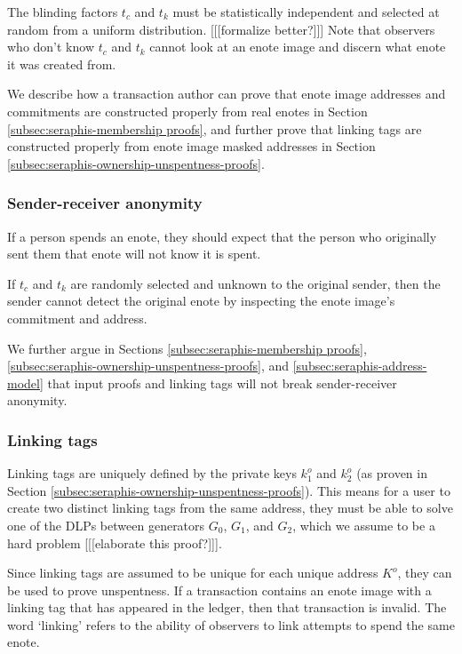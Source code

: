 The blinding factors $t_c$ and $t_k$ must be statistically independent and selected at random from a uniform distribution. [[[formalize better?]]] Note that observers who don't know $t_c$ and $t_k$ cannot look at an enote image and discern what enote it was created from.

We describe how a transaction author can prove that enote image addresses and commitments are constructed properly from real enotes in Section \ref{subsec:seraphis-membership proofs}, and further prove that linking tags are constructed properly from enote image masked addresses in Section \ref{subsec:seraphis-ownership-unspentness-proofs}.

\subsubsection{Sender-receiver anonymity}
\label{subsubsec:enote-images-sender-receiver-anonymity}

If a person spends an enote, they should expect that the person who originally sent them that enote will not know it is spent.

If $t_c$ and $t_k$ are randomly selected and unknown to the original sender, then the sender cannot detect the original enote by inspecting the enote image's commitment and address.

We further argue in Sections \ref{subsec:seraphis-membership proofs}, \ref{subsec:seraphis-ownership-unspentness-proofs}, and \ref{subsec:seraphis-address-model} that input proofs and linking tags will not break sender-receiver anonymity.

\subsubsection{Linking tags}
\label{subsubsec:enote-images-linking-tags}

Linking tags are uniquely defined by the private keys $k^o_1$ and $k^o_2$ (as proven in Section \ref{subsec:seraphis-ownership-unspentness-proofs}). This means for a user to create two distinct linking tags from the same address, they must be able to solve one of the DLPs between generators $G_0$, $G_1$, and $G_2$, which we assume to be a hard problem [[[elaborate this proof?]]].

Since linking tags are assumed to be unique for each unique address $K^o$, they can be used to prove unspentness. If a transaction contains an enote image with a linking tag that has appeared in the ledger, then that transaction is invalid. The word `linking' refers to the ability of observers to link attempts to spend the same enote.

